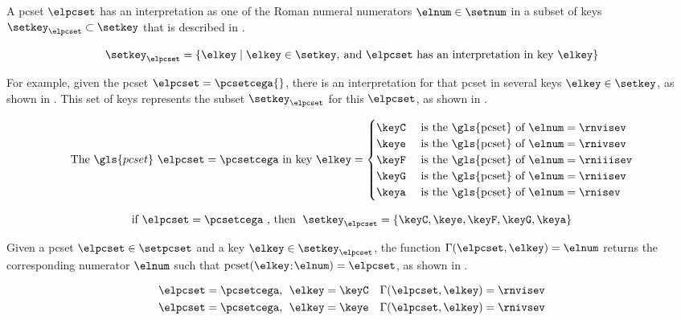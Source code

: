 
A \gls{pcset} $\elpcset$ has an interpretation as one of the
Roman numeral numerators $\elnum \in \setnum$ in a subset of
keys $\setkey_{\elpcset} \subset \setkey$ that is described
in .

\begin{equation}
    \label{eq:keys_for_pcset}
    \setkey_{\elpcset} = \{\elkey \mid \elkey \in \setkey,
     \: \text{and $\elpcset$ has an interpretation in key $\elkey$}\}
\end{equation}

For example, given the \gls{pcset} $\elpcset =
\pcsetcega{}$, there is an interpretation for that
\gls{pcset} in several keys $\elkey \in \setkey$, as shown
in . This set of keys represents the
subset $\setkey_\elpcset$ for this $\elpcset$, as shown in
. 

\begin{equation}
    \label{eq:pcset_cega}
    \text{The } \gls{pcset} \text{ } \elpcset = \pcsetcega \text{ in key } \elkey =
    \begin{cases}
        \keyC & \text{ is the \gls{pcset} of } \elnum = \rnvisev \\
        \keye & \text{ is the \gls{pcset} of } \elnum = \rnivsev \\
        \keyF & \text{ is the \gls{pcset} of } \elnum = \rniiisev \\
        \keyG & \text{ is the \gls{pcset} of } \elnum = \rniisev \\
        \keya & \text{ is the \gls{pcset} of } \elnum = \rnisev \\
    \end{cases}
\end{equation}

\begin{equation}
    \label{eq:keys_for_pcset_example}
    \text{if } \elpcset = \pcsetcega \text{ , then } \; 
    \setkey_{\elpcset} = \{ \keyC, \keye, \keyF, \keyG, \keya \}
\end{equation}

Given a \gls{pcset} $\elpcset \in \setpcset$ and a key
$\elkey \in \setkey_\elpcset$, the function
$\Gamma(\elpcset, \elkey) = \elnum$ returns the
corresponding numerator $\elnum$ such that
$\text{pcset}(\elkey$:$\elnum) = \elpcset$, as shown in
.

\begin{equation}
    \label{eq:numerator_from_pcset_key}
    \begin{split}
        \elpcset = \pcsetcega \text{, } \; \elkey = \keyC \quad \Gamma(\elpcset, \elkey) = \rnvisev \\
        \elpcset = \pcsetcega \text{, } \; \elkey = \keye \quad \Gamma(\elpcset, \elkey) = \rnivsev \\
    \end{split}
\end{equation}


